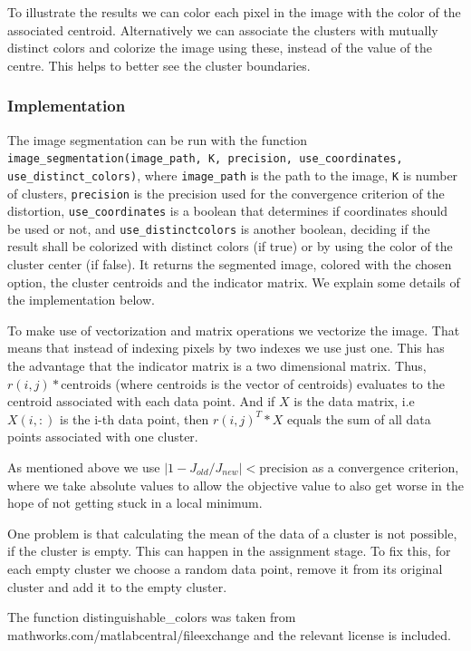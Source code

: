 To illustrate the results we can color each pixel in the image with the color of the associated centroid. Alternatively we can associate the clusters with mutually distinct colors and colorize the image using these, instead of the value of the centre. This helps to better see the cluster boundaries.

\subsubsection{Implementation}

The image segmentation can be run with the function \texttt{image\_segmentation(image\_path, K, precision, use\_coordinates, use\_distinct\_colors)}, where \texttt{image\_path} is the path to the image, \texttt{K} is number of clusters, \texttt{precision} is the precision used for the convergence criterion of the distortion, \texttt{use\_coordinates} is a boolean that determines if coordinates should be used or not, and \texttt{use\_distinctcolors} is another boolean, deciding if the result shall be colorized with distinct colors (if true) or by using the color of the cluster center (if false). It returns the segmented image, colored with the chosen option, the cluster centroids and the indicator matrix.
 We explain some details of the implementation below.

To make use of vectorization and matrix operations we vectorize the image. That means that instead of indexing pixels by two indexes we use just one. This has the advantage that the indicator matrix is a two dimensional matrix. Thus, $r(i,j)*\text{centroids}$ (where centroids is the vector of centroids) evaluates to the centroid associated with each data point. And if $X$ is the data matrix, i.e $X(i,:)$ is the i-th data point, then $r(i,j)^T * X$ equals the sum of all data points associated with one cluster.

As mentioned above we use $\vert 1-J_{old}/J_{new}\vert < \text{precision}$ as a convergence criterion, where we take absolute values to allow the objective value to also get worse in the hope of not getting stuck in a local minimum.

One problem is that calculating the mean of the data of a cluster is not possible, if the cluster is empty. This can happen in the assignment stage. To fix this, for each empty cluster we choose a random data point, remove it from its original cluster and add it to the empty cluster.

The function distinguishable\_colors was taken from mathworks.com/matlabcentral/fileexchange and the relevant license is included.
